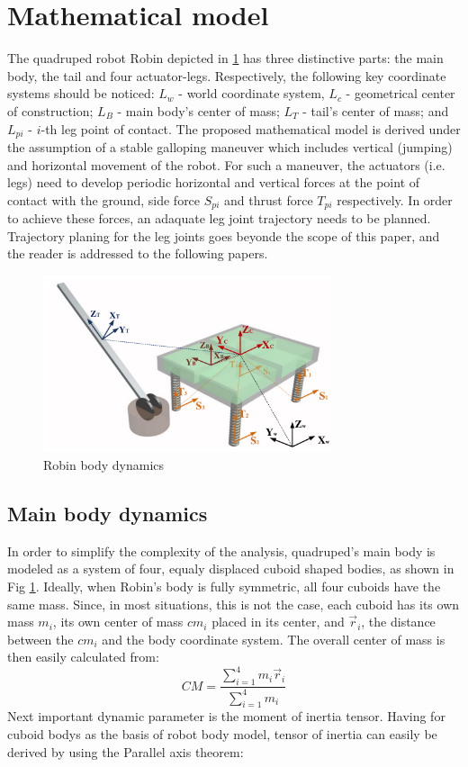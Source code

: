 \section{Mathematical model}
The quadruped robot Robin depicted in \ref{fig:rmoment} has three distinctive parts: the main body, the tail and four actuator-legs. Respectively, the following key coordinate systems should be noticed: $L_w$ - world coordinate system, $L_c$ - geometrical center of construction; $L_B$ - main body's center of mass; $L_T$ - tail's center of mass; and $L_{pi}$ - $i$-th leg point of contact. The proposed mathematical model is derived under the assumption of a stable galloping maneuver which includes vertical (jumping) and horizontal movement of the robot. For such a maneuver, the actuators (i.e. legs) need to develop periodic horizontal and vertical forces at the point of contact with the ground, side force $S_{pi}$ and thrust force $T_{pi}$ respectively. In order to achieve these forces, an adaquate leg joint trajectory needs to be planned. Trajectory planing for the leg joints goes beyonde the scope of this paper, and the reader is addressed to the following papers. 

\begin{figure}
	\centering
	\includegraphics[width=85mm]{./pictures/RobinMoment.pdf}
	\caption{Robin body dynamics}
	\label{fig:rmoment}
\end{figure}

\subsection{Main body dynamics}
In order to simplify the complexity of the analysis, quadruped's main body is modeled as a system of four, equaly displaced cuboid shaped bodies, as shown in Fig \ref{fig:rmoment}. Ideally, when Robin's body is fully symmetric, all four cuboids have the same mass. Since, in most situations, this is not the case, each cuboid has its own mass $m_i$, its own center of mass $cm_i$ placed in its center, and $\vec{r}_i$, the distance between the $cm_i$ and the body coordinate system. The overall center of mass is then easily calculated from: 
\begin{equation}\label{eq:CMrobot}
CM=\frac{\sum_{i=1}^{4}m_i\vec{r}_i}{\sum_{i=1}^{4}m_i}
\end{equation}
Next important dynamic parameter is the moment of inertia tensor. Having for cuboid bodys as the basis of robot body model, tensor of inertia can easily be derived by using the Parallel axis theorem:

